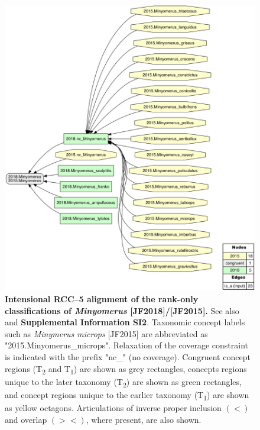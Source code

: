 \documentclass[fleqn,10pt,lineno]{wlpeerj} %
\begin{document}
\begin{figure}[h]
	\centering
	\includegraphics[width=\textwidth]{align1.jpg}
	\caption{\textbf{Intensional RCC--5 alignment of the rank-only classifications of \textit{Minyomerus} [JF2018]/[JF2015].} See also \citet{jansen2015} and \textbf{Supplemental Information SI2}. Taxonomic concept labels such as \textit{Minymerus microps} [JF2015] are abbreviated as "2015.Minyomerus\_microps". Relaxation of the coverage constraint is indicated with the prefix "nc\_" (no coverage). Congruent concept regions (T\textsubscript{2} and T\textsubscript{1}) are shown as grey rectangles, concepts regions unique to the later taxonomy (T\textsubscript{2}) are shown as green rectangles, and concept regions unique to the earlier taxonomy (T\textsubscript{1}) are shown as yellow octagons. Articulations of inverse proper inclusion $(<)$ and overlap $(><)$, where present, are also shown.}
	\label{fig:align1}
\end{figure}
\end{document}
